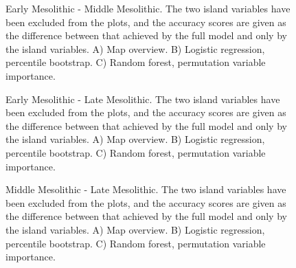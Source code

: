 \documentclass[12pt, a4paper]{article}
\begin{document}
\begin{figure}
	\caption[Early Mesolithic - Middle Mesolithic]{Early Mesolithic - Middle Mesolithic. The two island variables have been excluded from the plots, and the accuracy scores are given as the difference between that achieved by the full model and only by the island variables. A) Map overview. B) Logistic regression, percentile bootstrap. C) Random forest, permutation variable importance.}
	\label{fig:em_mm}
\bigbreak
	\caption[Early Mesolithic - Late Mesolithic]{Early Mesolithic - Late Mesolithic. The two island variables have been excluded from the plots, and the accuracy scores are given as the difference between that achieved by the full model and only by the island variables. A) Map overview. B) Logistic regression, percentile bootstrap. C) Random forest, permutation variable importance.}
	\label{fig:em_lm}
\end{figure}

\begin{figure}
	\caption[Middle Mesolithic- Late Mesolithic]{Middle Mesolithic - Late Mesolithic. The two island variables have been excluded from the plots, and the accuracy scores are given as the difference between that achieved by the full model and only by the island variables. A) Map overview. B) Logistic regression, percentile bootstrap. C) Random forest, permutation variable importance.}
	\label{fig:mm_lm}
\end{figure}
\end{document}
